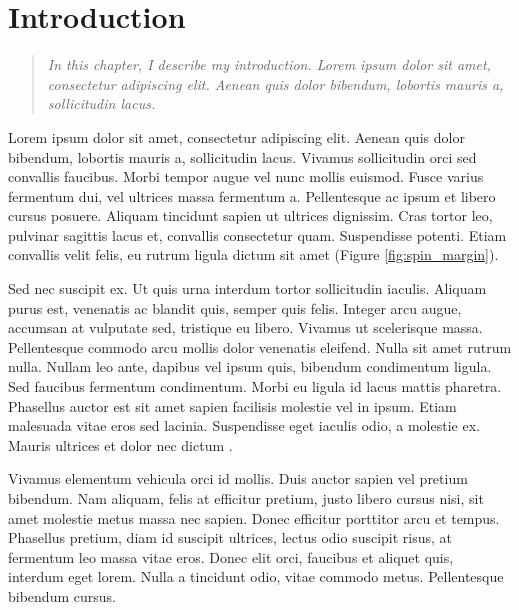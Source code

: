 \chapter{Introduction}

\begin{quote}
\textit{In this chapter, I describe my introduction. Lorem ipsum dolor sit amet, consectetur adipiscing elit. Aenean quis dolor bibendum, lobortis mauris a, sollicitudin lacus.} \newline
\end{quote}

Lorem ipsum dolor sit amet, consectetur adipiscing elit. Aenean quis dolor bibendum, lobortis mauris a, sollicitudin lacus. Vivamus sollicitudin orci sed convallis faucibus. Morbi tempor augue vel nunc mollis euismod. Fusce varius fermentum dui, vel ultrices massa fermentum a. Pellentesque ac ipsum et libero cursus posuere. Aliquam tincidunt sapien ut ultrices dignissim. Cras tortor leo, pulvinar sagittis lacus et, convallis consectetur quam. Suspendisse potenti. Etiam convallis velit felis, eu rutrum ligula dictum sit amet (Figure \ref{fig:spin_margin}).


Sed nec suscipit ex. Ut quis urna interdum tortor sollicitudin iaculis. Aliquam purus est, venenatis ac blandit quis, semper quis felis. Integer arcu augue, accumsan at vulputate sed, tristique eu libero. Vivamus ut scelerisque massa. Pellentesque commodo arcu mollis dolor venenatis eleifend. Nulla sit amet rutrum nulla. Nullam leo ante, dapibus vel ipsum quis, bibendum condimentum ligula. Sed faucibus fermentum condimentum. Morbi eu ligula id lacus mattis pharetra. Phasellus auctor est sit amet sapien facilisis molestie vel in ipsum. Etiam malesuada vitae eros sed lacinia. Suspendisse eget iaculis odio, a molestie ex. Mauris ultrices et dolor nec dictum \cite{tseng_dis_spin}.

Vivamus elementum vehicula orci id mollis. Duis auctor sapien vel pretium bibendum. Nam aliquam, felis at efficitur pretium, justo libero cursus nisi, sit amet molestie metus massa nec sapien. Donec efficitur porttitor arcu et tempus. Phasellus pretium, diam id suscipit ultrices, lectus odio suscipit risus, at fermentum leo massa vitae eros. Donec elit orci, faucibus et aliquet quis, interdum eget lorem. Nulla a tincidunt odio, vitae commodo metus. Pellentesque bibendum cursus.

